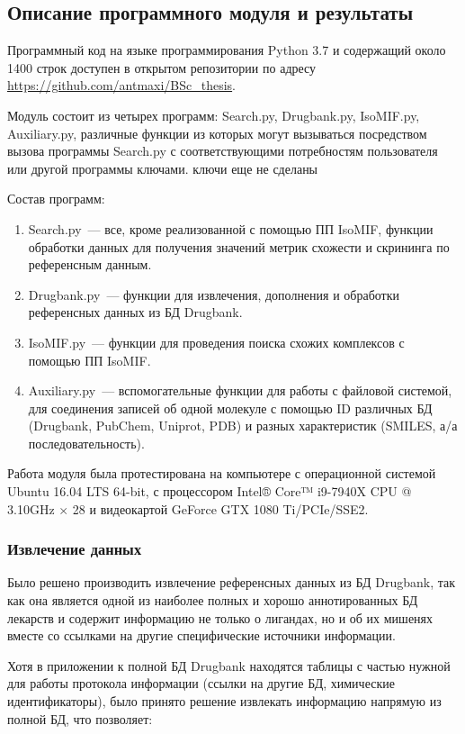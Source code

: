 \documentclass[a4paper,14pt]{article}         %
\begin{document}
\subsection{Описание программного модуля и результаты}
Программный код на языке программирования Python 3.7 \cite{python37} и содержащий около 1400 строк доступен в открытом репозитории по адресу \href{https://github.com/antmaxi/BSc\_thesis}{https://github.com/antmaxi/BSc\_thesis}.

Модуль состоит из четырех программ: Search.py, Drugbank.py, IsoMIF.py, Auxiliary.py, различные функции из которых могут вызываться посредством вызова программы Search.py с соответствующими потребностям пользователя или другой программы ключами. \color{orange} ключи еще не сделаны \color{black}

Состав программ:
\begin{enumerate}
	\item Search.py~--- все, кроме реализованной с помощью ПП IsoMIF, функции обработки данных для получения значений метрик схожести и скрининга по референсным данным.
	\item Drugbank.py~--- функции для извлечения, дополнения и обработки референсных данных из БД Drugbank.
	\item IsoMIF.py~--- функции для проведения поиска схожих комплексов с помощью ПП IsoMIF.
	\item Auxiliary.py~--- вспомогательные функции для работы с файловой системой, для соединения записей об одной молекуле с помощью ID различных БД (Drugbank, PubChem, Uniprot, PDB) и разных характеристик (SMILES, а/а последовательность).
\end{enumerate}

Работа модуля была протестирована на компьютере с операционной системой Ubuntu 16.04 LTS 64-bit, с процессором Intel® Core™ i9-7940X CPU @ 3.10GHz $\times$ 28 и видеокартой GeForce GTX 1080 Ti/PCIe/SSE2.
\subsubsection{Извлечение данных}
Было решено производить извлечение референсных данных из БД Drugbank, так как она является одной из наиболее полных и хорошо аннотированных БД лекарств \cite{Wishart2017} и содержит информацию не только о лигандах, но и об их мишенях вместе со ссылками на другие специфические источники информации. 

Хотя в приложении к полной БД Drugbank находятся таблицы с частью нужной для работы протокола информации (ссылки на другие БД, химические идентификаторы), было принято решение извлекать информацию напрямую из полной БД, что позволяет: 
\end{document}
